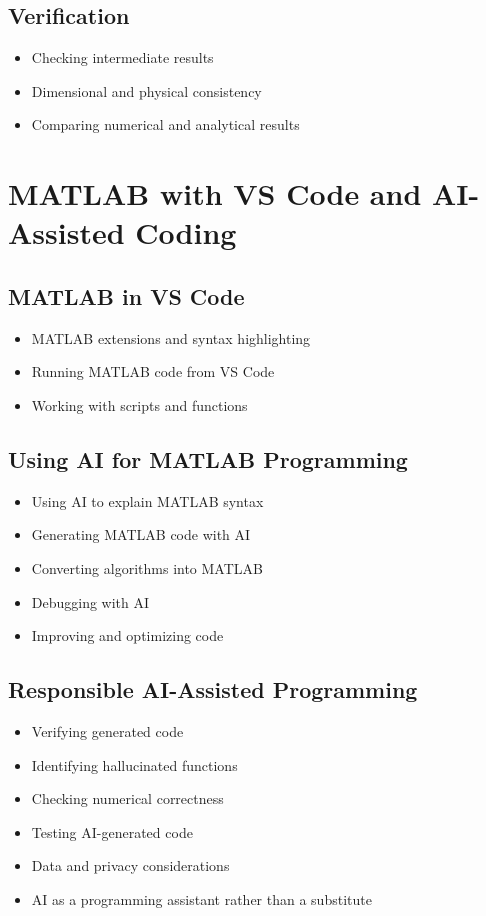\documentclass[11pt, a4paper]{article}
\begin{document}
\subsection{Verification}
\begin{itemize}
  \item Checking intermediate results
  \item Dimensional and physical consistency
  \item Comparing numerical and analytical results
\end{itemize}

\section{MATLAB with VS Code and AI-Assisted Coding}

\subsection{MATLAB in VS Code}
\begin{itemize}
  \item MATLAB extensions and syntax highlighting
  \item Running MATLAB code from VS Code
  \item Working with scripts and functions
\end{itemize}

\subsection{Using AI for MATLAB Programming}
\begin{itemize}
  \item Using AI to explain MATLAB syntax
  \item Generating MATLAB code with AI
  \item Converting algorithms into MATLAB
  \item Debugging with AI
  \item Improving and optimizing code
\end{itemize}

\subsection{Responsible AI-Assisted Programming}
\begin{itemize}
  \item Verifying generated code
  \item Identifying hallucinated functions
  \item Checking numerical correctness
  \item Testing AI-generated code
  \item Data and privacy considerations
  \item AI as a programming assistant rather than a substitute
\end{itemize}
\end{document}
